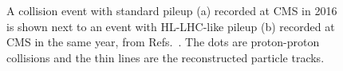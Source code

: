 \begin{figure}[!htb]
    \centering
    \qquad
    \caption{
        A collision event with standard pileup (a) recorded at CMS in 2016 is shown next to an event with HL-LHC-like pileup (b) recorded at CMS in the same year, from Refs.~\cite{NormalPU2016, HighPU2016}.
        The dots are proton-proton collisions and the thin lines are the reconstructed particle tracks.
    }
    \label{fig:pileup}
\end{figure}
